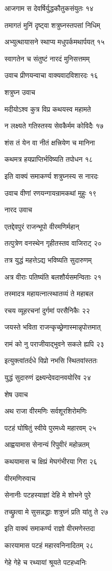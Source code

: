 आजगाम स देवर्षिर्युद्धकौतुकसंयुतः १४

तमागतं मुनिं दृष्ट्वा शत्रुघ्नस्तपसां निधिम्

अभ्युत्थायासने स्थाप्य मधुपर्कमथार्पयत् १५

स्वागतेन च संतुष्टं नारदं मुनिसत्तमम्

उवाच प्रीणयन्वाचा वाक्यवादविशारदः १६

शत्रुघ्न उवाच

मदीयोऽश्व कुत्र विप्र कथयस्व महामते

न लक्ष्यते गतिस्तस्य सेवकैर्मम कोविदैः १७

शंस तं येन वा नीतं क्षत्त्रियेण च मानिना

कथमत्र हयप्राप्तिर्भविष्यति तपोधन १८

इति वाक्यं समाकर्ण्य शत्रुघ्नस्य स नारदः

उवाच वीणां रणयन्गायन्रामकथां मुहुः १९

नारद उवाच

एतद्देवपुरं राजन्भूपो वीरमणिर्महान्

तत्पुत्रेण वनस्थेन गृहीतस्तव वाजिराट् २०

तत्र युद्धं महत्तेऽद्य भविष्यति सुदारुणम्

अत्र वीराः पतिष्यंति बलशौर्यसमन्विताः २१

तस्मादत्र महायत्नात्स्थातव्यं ते महाबल

रचय व्यूहरचनां दुर्गमां परसैनिकैः २२

जयस्ते भविता राजन्कृच्छ्रेणास्मान्नृपोत्तमात्

रामं को नु पराजीयाद्भुवने सकले ह्यपि २३

इत्युक्त्वांतर्दधे विप्रो नभसि स्थितवांस्ततः

युद्धं सुदारुणं द्रक्ष्यन्देवदानवयोरिव २४

शेष उवाच

अथ राजा वीरमणिः सर्वशूरशिरोमणिः

पटहं घोषितुं स्वीये पुरमध्ये महारवम् २५

आह्वयामास सेनान्यं रिपुवीरं महोन्नतम्

कथयामास च क्षिप्रं मेघगंभीरया गिरा २६

वीरमणिरुवाच

सेनानीः पटहस्याज्ञां देहि मे शोभने पुरे

तच्छ्रुत्वा मे सुसन्नद्धाः शत्रुघ्नं प्रति यांतु ते २७

इति वाक्यं समाकर्ण्य राज्ञो वीरमणेस्तदा

कारयामास पटहं महारवनिनादितम् २८

गेहे गेहे च रथ्यायां श्रूयते पटहध्वनिः

